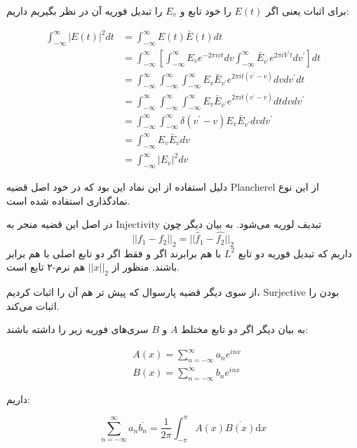 \documentclass[12pt]{article}
\begin{document}
برای اثبات یعنی اگر $E(t)$ را خود تابع و $E_v$ را تبدیل فوریه آن در نظر بگیریم داریم:


 $$
 \begin{aligned}
 	\int_{-\infty}^{\infty}|E(t)|^{2} d t &=\int_{-\infty}^{\infty} E(t) \bar{E}(t) d t \\
 	&=\int_{-\infty}^{\infty}\left[\int_{-\infty}^{\infty} E_{v} e^{-2 \pi i v t} d v \int_{-\infty}^{\infty} \bar{E}_{v^{\prime}} e^{2 \pi i V^{\prime} t} d v^{\prime}\right] d t \\
 	&=\int_{-\infty}^{\infty} \int_{-\infty}^{\infty} \int_{-\infty}^{\infty} E_{v} \bar{E}_{v^{\prime}} e^{2 \pi i t\left(v^{\prime}-v\right)} d v d v^{\prime} d t \\
 	&=\int_{-\infty}^{\infty} \int_{-\infty}^{\infty} \int_{-\infty}^{\infty} E_{v} \bar{E}_{v^{\prime}} e^{2 \pi i t\left(v^{\prime}-v\right)} d t d v d v^{\prime} \\
 	&=\int_{-\infty}^{\infty} \int_{-\infty}^{\infty} \delta\left(v^{\prime}-v\right) E_{v} \bar{E}_{v^{\prime}} d v d v^{\prime} \\
 	&=\int_{-\infty}^{\infty} E_{v} \bar{E}_{v} d v \\
 	&=\int_{-\infty}^{\infty}\left|E_{v}\right|^{2} d v
 \end{aligned}
 $$
 
 دلیل استفاده از این نماد این بود که در خود اصل قضیه Plancherel از این نوع نمادگذاری استفاده شده است.
 
 در اصل این قضیه منجر به Injectivity تبدیف لوریه می‌شود. به  بیان دیگر چون
 $$||f_1 -f_2||_2 = ||\hat{f}_1 - \hat{f_2}||_2$$
 داریم که تبدیل فوریه دو تابع $L^2$ با هم برابرند اگر و فقط اگر دو تابع اصلی با هم برابر باشند. منظور از $||x||_2$
 هم نرم-۲ تابع است.
 
 
 از سوی دیگر قضیه پارسوال که پیش تر هم آن را اثبات کردیم، Surjective بودن را اثبات می‌کند.
 
 به بیان دیگر اگر دو تابع مختلط $A$ و $B$ سری‌های فوریه زیر را داشته باشند:
 
 $$
 \begin{aligned}
 	&A(x)=\sum_{n=-\infty}^{\infty} a_{n} e^{i n x}\\
 	&B(x)=\sum_{n=-\infty}^{\infty} b_{n} e^{i n x}
 \end{aligned}
 $$
 
 داریم:
 
 $$
 \sum_{n=-\infty}^{\infty} a_{n} \overline{b_{n}}=\frac{1}{2 \pi} \int_{-\pi}^{\pi} A(x) \overline{B(x)} \mathrm{d} x
 $$
 
\end{document}
